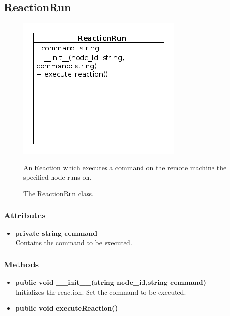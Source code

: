 \newpage
\subsection{ReactionRun}
\begin{figure}[htbp]
	\begin{minipage}[t]{8cm}
		\vspace{0pt}
		\centering
		\includegraphics[scale=0.6]{./diagram_pictures/reactor/ReactionRun.png}
		\caption{The ReactionRun class.}
	\end{minipage}
	\hfill
	\begin{minipage}[t]{8cm}
		\vspace{10pt}
			An Reaction which executes a command on the remote machine the specified node runs on. 
	\end{minipage}
\end{figure}

\subsubsection{Attributes}
\begin{itemize}
	\item \textbf{ private string command }\\
	Contains the command to be executed.
\end{itemize}
\subsubsection{Methods}
\begin{itemize}
	\item \textbf{ public void \_\_init\_\_(string node\_id,string command) }\\
		Initializes the reaction. Set the command to be executed.
	\item \textbf{ public void executeReaction() }\\
\end{itemize}


